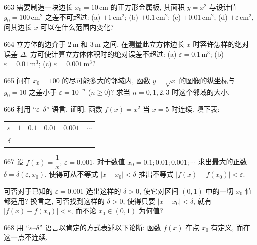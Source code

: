 \begin{prob}[L]{663}
需要制造一块边长 $x_0 = 10\,\mathrm{cm}$ 的正方形金属板, 其面积 $y = x^2$ 与设计值 $y_0 = 100\,\mathrm{cm}^2$ 之差不可超过: (a) $\pm 1\,\mathrm{cm}^2$; (b) $\pm 0.1\,\mathrm{cm}^2$; (c) $\pm 0.01\,\mathrm{cm}^2$; (d) $\pm \varepsilon\,\mathrm{cm}^2$, 问其边长 $x$ 可以在什么范围内变化?
\end{prob}

\begin{prob}[L]{664}
立方体的边介于 $2\,\mathrm{m}$ 和 $3\,\mathrm{m}$ 之间, 在测量此立方体边长 $x$ 时容许怎样的绝对误差 $\Delta$, 方可使计算立方体体积时的绝对误差不超过: (a) $\varepsilon = 0.1\,\mathrm{m}^3$; (b) $\varepsilon = 0.01\,\mathrm{m}^3$; (c) $\varepsilon = 0.001\,\mathrm{m}^3$?
\end{prob}

\begin{prob}[M]{665}
问在 $x_0 = 100$ 的尽可能多大的邻域内, 函数 $y = \sqrt{x}$ 的图像的纵坐标与 $y_0 = 10$ 之差小于 $\varepsilon = 10^{-n}$ ($n \geqslant 0$)? 求当 $n = 0, 1, 2, 3$ 时这个邻域的大小.
\end{prob}

\begin{prob}[M]{666}
利用 “$\varepsilon$--$\delta$” 语言, 证明: 函数 $f(x) = x^2$ 当 $x = 5$ 时连续. 填下表:
\begin{center}
\begin{tabular}{c|c|c|c|c|c}
\hline
$\varepsilon$ & \quad $1$ \quad & \quad $0.1$ \quad & \quad $0.01$ \quad & \quad $0.001$ \quad & \quad $\cdots$ \quad \\
\hline
$\delta$ & & & & & \\
\hline
\end{tabular}
\end{center}
\end{prob}

\begin{prob}[M]{667}
设 $f(x) = \dfrac{1}{x}$, $\varepsilon = 0.001$. 对于数值 $x_0 = 0.1; 0.01; 0.001; \cdots$ 求出最大的正数 $\delta = \delta(\varepsilon, x_0)$, 使得可从不等式 $|x - x_0| < \delta$ 推出不等式 $|f(x) - f(x_0)| < \varepsilon$.

可否对于已知的 $\varepsilon = 0.001$ 选出这样的 $\delta > 0$, 使它对区间 $(0, 1)$ 中的一切 $x_0$ 值都适用? 换言之, 可否找到这样的 $\delta > 0$, 使得只要 $|x - x_0| < \delta$, 就有 $|f(x) - f(x_0)| < \varepsilon$, 而不论 $x_0 \in (0, 1)$ 为何值?
\end{prob}

\begin{prob}[M]{668}
用 “$\varepsilon$--$\delta$” 语言以肯定的方式表述以下论断: 函数 $f(x)$ 在点 $x_0$ 有定义, 而在这一点不连续.
\end{prob}

